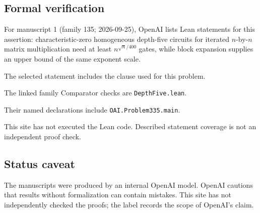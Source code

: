 \documentclass[11pt]{article}
\begin{document}
\subsection{Formal verification}
For manuscript 1 (family 135; 2026-09-25), OpenAI lists Lean statements for this assertion: characteristic-zero homogeneous depth-five circuits for iterated $n$-by-$n$ matrix multiplication need at least $n^{\sqrt n/400}$ gates, while block expansion supplies an upper bound of the same exponent scale.

The selected statement includes the clause used for this problem.

The linked family Comparator checks are \texttt{DepthFive.lean}.

Their named declarations include \texttt{OAI.Problem335.main}.

This site has not executed the Lean code. Described statement coverage is not an independent proof check.

\subsection{Status caveat}
The manuscripts were produced by an internal OpenAI model. OpenAI cautions that results without formalization can contain mistakes. This site has not independently checked the proofs; the label records the scope of OpenAI's claim.
\end{document}
